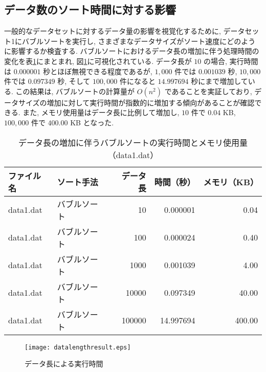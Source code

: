 \documentclass[a4j, 11pt]{jarticle}
\begin{document}
\subsection{データ数のソート時間に対する影響}
一般的なデータセットに対するデータ量の影響を視覚化するために, データセット1にバブルソートを実行し, さまざまなデータサイズがソート速度にどのように影響するか検査する. バブルソートにおけるデータ長の増加に伴う処理時間の変化を表\ref{bubblesortscaling}にまとまれ, 図\ref{datalengthresultgraph}に可視化されている. データ長が $10$ の場合, 実行時間は $0.000001$ 秒とほぼ無視できる程度であるが, $1,000$ 件では $0.001039$ 秒, $10,000$ 件では $0.097349$ 秒, そして $100,000$ 件になると $14.997694$ 秒にまで増加している. この結果は, バブルソートの計算量が $O(n^2)$ であることを実証しており, データサイズの増加に対して実行時間が指数的に増加する傾向があることが確認できる. また, メモリ使用量はデータ長に比例して増加し, $10$ 件で $0.04$ KB, $100,000$ 件で $400.00$ KB となった. 
\begin{table}[H]
  \centering
  \caption{データ長の増加に伴うバブルソートの実行時間とメモリ使用量（data1.dat）}
  \label{bubblesortscaling}
  \begin{tabular}{|l|l|r|r|r|}
    \hline
    \textbf{ファイル名} & \textbf{ソート手法} & \textbf{データ長} & \textbf{時間（秒）} & \textbf{メモリ（KB）} \\
    \hline
    data1.dat & バブルソート & 10      & 0.000001  & 0.04   \\
    data1.dat & バブルソート & 100     & 0.000024  & 0.40   \\
    data1.dat & バブルソート & 1000    & 0.001039  & 4.00   \\
    data1.dat & バブルソート & 10000   & 0.097349  & 40.00  \\
    data1.dat & バブルソート & 100000  & 14.997694 & 400.00 \\
    \hline
  \end{tabular}
\end{table}

\begin{figure}[H]
  \centering
  \texttt{[image: datalengthresult.eps]}
  \caption{データ長による実行時間}\label{datalengthresultgraph}
\end{figure}
\end{document}
